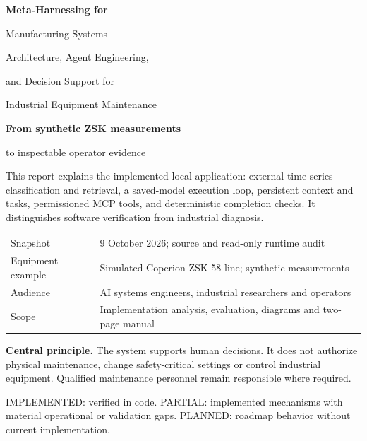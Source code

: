 \documentclass[a4paper,11pt,oneside]{report}
\begin{document}
\begin{titlepage}\thispagestyle{empty}
\vspace{9mm}
{\sffamily\bfseries\color{white}\fontsize{29}{34}\selectfont Meta-Harnessing for\par Manufacturing Systems\par}\vspace{9mm}
{\sffamily\color{white}\fontsize{17}{23}\selectfont Architecture, Agent Engineering,\par and Decision Support for\par Industrial Equipment Maintenance\par}
\vspace{30mm}
{\sffamily\Large\bfseries From synthetic ZSK measurements\par to inspectable operator evidence\par}\vspace{8mm}
This report explains the implemented local application: external time-series classification and retrieval, a saved-model execution loop, persistent context and tasks, permissioned MCP tools, and deterministic completion checks. It distinguishes software verification from industrial diagnosis.\par\vspace{8mm}
\begin{tabularx}{\linewidth}{@{}lX@{}}\toprule
Snapshot & 9 October 2026; source and read-only runtime audit\\
Equipment example & Simulated Coperion ZSK 58 line; synthetic measurements\\
Audience & AI systems engineers, industrial researchers and operators\\
Scope & Implementation analysis, evaluation, diagrams and two-page manual\\\bottomrule
\end{tabularx}\vfill
\textbf{Central principle.} The system supports human decisions. It does not authorize physical maintenance, change safety-critical settings or control industrial equipment. Qualified maintenance personnel remain responsible where required.\par\medskip
{\small\color{muted}IMPLEMENTED: verified in code. PARTIAL: implemented mechanisms with material operational or validation gaps. PLANNED: roadmap behavior without current implementation.}
\end{titlepage}\setcounter{page}{2}
\end{document}
